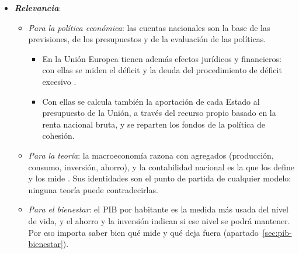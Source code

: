 \documentclass[11pt]{article}
\begin{document}
\begin{itemize}
\item \textbf{\emph{Relevancia}}:
  \begin{itemize}
  \item \emph{Para la política económica}: las cuentas nacionales son la base de las previsiones, de los presupuestos y de la evaluación de las políticas.
    \begin{itemize}
    \item En la Unión Europea tienen además efectos jurídicos y financieros: con ellas se miden el déficit y la deuda del procedimiento de déficit excesivo .
    \item Con ellas se calcula también la aportación de cada Estado al presupuesto de la Unión, a través del recurso propio basado en la renta nacional bruta, y se reparten los fondos de la política de cohesión\nocite{SEC2010}.
    \end{itemize}
  \item \emph{Para la teoría}: la macroeconomía razona con agregados (producción, consumo, inversión, ahorro), y la contabilidad nacional es la que los define y los mide . Sus identidades son el punto de partida de cualquier modelo: ninguna teoría puede contradecirlas.
  \item \emph{Para el bienestar}: el PIB por habitante es la medida más usada del nivel de vida, y el ahorro y la inversión indican si ese nivel se podrá mantener. Por eso importa saber bien qué mide y qué deja fuera (apartado~\ref{sec:pib-bienestar}).
  \end{itemize}


\end{itemize}
\end{document}
